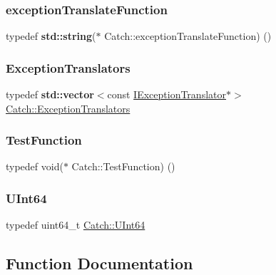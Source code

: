 \subsubsection{\texorpdfstring{exception\+Translate\+Function}{exceptionTranslateFunction}}
{\footnotesize\ttfamily typedef \textbf{ std\+::string}($\ast$ Catch\+::exception\+Translate\+Function) ()}

\mbox{\label{namespace_catch_ae0442a3627f91437716106138b5f540b}} 
\subsubsection{\texorpdfstring{Exception\+Translators}{ExceptionTranslators}}
{\footnotesize\ttfamily typedef \textbf{ std\+::vector}$<$const \hyperlink{struct_catch_1_1_i_exception_translator}{I\+Exception\+Translator}$\ast$$>$ \hyperlink{namespace_catch_ae0442a3627f91437716106138b5f540b}{Catch\+::\+Exception\+Translators}}

\mbox{\label{namespace_catch_a26414f52d0835939fae52aadd27e6257}} 
\subsubsection{\texorpdfstring{Test\+Function}{TestFunction}}
{\footnotesize\ttfamily typedef void($\ast$ Catch\+::\+Test\+Function) ()}

\mbox{\label{namespace_catch_a47aaf167582b2a30e5acd3bd874deb05}} 
\subsubsection{\texorpdfstring{U\+Int64}{UInt64}}
{\footnotesize\ttfamily typedef uint64\+\_\+t \hyperlink{namespace_catch_a47aaf167582b2a30e5acd3bd874deb05}{Catch\+::\+U\+Int64}}



\subsection{Function Documentation}
\mbox{\label{namespace_catch_ad425271249dd02956a9709e78b8b2783}} 
